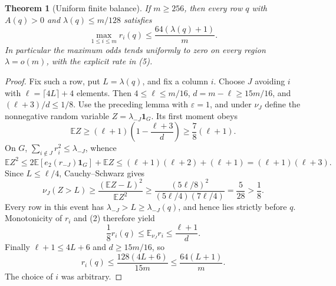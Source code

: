\documentclass[11pt]{article}
\newtheorem{theorem}{Theorem}
\newcommand{\E}{\mathbb E}
\begin{document}
\begin{theorem}[Uniform finite balance]\label{balance}
If $m\ge256$, then every row $q$ with $A(q)>0$ and
$\lambda(q)\le m/128$ satisfies
\[
 \max_{1\le i\le m} r_i(q)
       \le \frac{64(\lambda(q)+1)}{m}.             \tag{5}
\]
In particular the maximum odds tends uniformly to zero on every
region $\lambda=o(m)$, with the explicit rate in (5).
\end{theorem}
\begin{proof}
Fix such a row, put $L=\lambda(q)$, and fix a column $i$.
Choose $J$ avoiding $i$ with
$\ell=\lceil4L\rceil+4$ elements. Then $4\le\ell\le m/16$,
$d=m-\ell\ge15m/16$, and $(\ell+3)/d\le1/8$.
Use the preceding lemma with $\varepsilon=1$, and under $\nu_J$
define the nonnegative random variable
$Z=\lambda_{-J}\boldsymbol1_G$. Its first moment obeys
\[
 \E Z\ge(\ell+1)\left(1-\frac{\ell+3}{d}\right)
       \ge\frac78(\ell+1).
\]
On $G$, $\sum_{i\notin J}r_i^2\le\lambda_{-J}$, whence
\[
 \E Z^2\le2\E[e_2(r_{-J})\boldsymbol1_G]+\E Z
       \le(\ell+1)(\ell+2)+(\ell+1)
       =(\ell+1)(\ell+3).
\]
Since $L\le\ell/4$, Cauchy--Schwarz gives
\[
 \nu_J(Z>L)\ge\frac{(\E Z-L)^2}{\E Z^2}
 \ge\frac{(5\ell/8)^2}{(5\ell/4)(7\ell/4)}
 =\frac5{28}>\frac18.
\]
Every row in this event has $\lambda_{-J}>L\ge\lambda_{-J}(q)$,
and hence lies strictly before $q$. Monotonicity of $r_i$ and (2)
therefore yield
\[
 \frac18r_i(q)\le\E_{\nu_J}r_i\le\frac{\ell+1}{d}.
\]
Finally $\ell+1\le4L+6$ and $d\ge15m/16$, so
\[
 r_i(q)\le\frac{128(4L+6)}{15m}
          \le\frac{64(L+1)}m.
\]
The choice of $i$ was arbitrary.
\end{proof}
\end{document}
